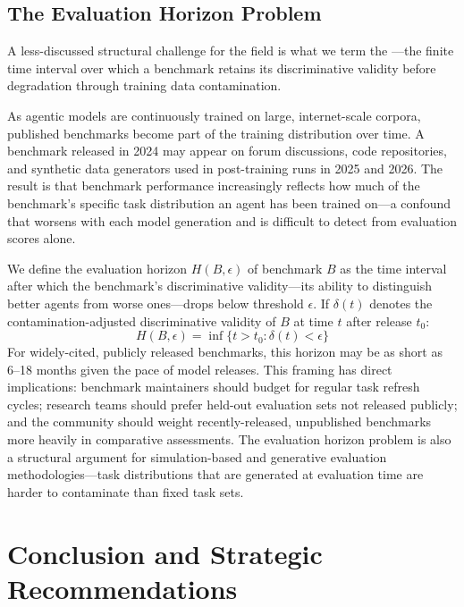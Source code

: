 \subsection{The Evaluation Horizon Problem}

A less-discussed structural challenge for the field is what we term the ---the finite time interval over which a benchmark retains its discriminative validity before degradation through training data contamination.

As agentic models are continuously trained on large, internet-scale corpora, published benchmarks become part of the training distribution over time. A benchmark released in 2024 may appear on forum discussions, code repositories, and synthetic data generators used in post-training runs in 2025 and 2026. The result is that benchmark performance increasingly reflects how much of the benchmark's specific task distribution an agent has been trained on---a confound that worsens with each model generation and is difficult to detect from evaluation scores alone.

We define the evaluation horizon $H(B, \epsilon)$ of benchmark $B$ as the time interval after which the benchmark's discriminative validity---its ability to distinguish better agents from worse ones---drops below threshold $\epsilon$. If $\delta(t)$ denotes the contamination-adjusted discriminative validity of $B$ at time $t$ after release $t_0$:
\begin{equation}
    H(B, \epsilon) = \inf \{ t > t_0 : \delta(t) < \epsilon \}
\end{equation}
For widely-cited, publicly released benchmarks, this horizon may be as short as 6--18 months given the pace of model releases. This framing has direct implications: benchmark maintainers should budget for regular task refresh cycles; research teams should prefer held-out evaluation sets not released publicly; and the community should weight recently-released, unpublished benchmarks more heavily in comparative assessments. The evaluation horizon problem is also a structural argument for simulation-based and generative evaluation methodologies---task distributions that are generated at evaluation time are harder to contaminate than fixed task sets.

\section{Conclusion and Strategic Recommendations}
\label{sec:conclusion}

